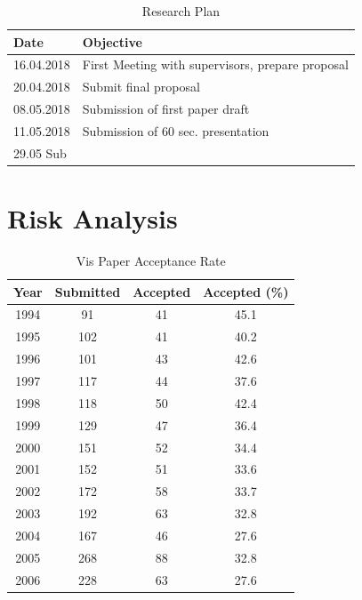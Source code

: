 \documentclass[journal]{vgtc}                %
\begin{document}
\begin{table}
  \caption{Research Plan}
  \label{tab:vis_accept}
  \scriptsize
  \begin{center}
    \begin{tabular}{ll}
      Date & Objective \\
    \hline
      16.04.2018 &  First Meeting  with supervisors, prepare proposal \\
      20.04.2018 & Submit final proposal \\
      08.05.2018 & Submission of first paper draft \\
      11.05.2018 & Submission of 60 sec. presentation \\
      29.05 Sub
	\end{tabular}
  \end{center}
\end{table}


\section{Risk Analysis}

\begin{table}
  \caption{Vis Paper Acceptance Rate}
  \label{tab:vis_accept}
  \scriptsize
  \begin{center}
    \begin{tabular}{cccc}
      Year & Submitted & Accepted & Accepted (\%)\\
    \hline
      1994 &  91 & 41 & 45.1\\
      1995 & 102 & 41 & 40.2\\
      1996 & 101 & 43 & 42.6\\
      1997 & 117 & 44 & 37.6\\
      1998 & 118 & 50 & 42.4\\
      1999 & 129 & 47 & 36.4\\
      2000 & 151 & 52 & 34.4\\
      2001 & 152 & 51 & 33.6\\
      2002 & 172 & 58 & 33.7\\
      2003 & 192 & 63 & 32.8\\
      2004 & 167 & 46 & 27.6\\
      2005 & 268 & 88 & 32.8\\
      2006 & 228 & 63 & 27.6
    \end{tabular}
  \end{center}
\end{table}
\end{document}
